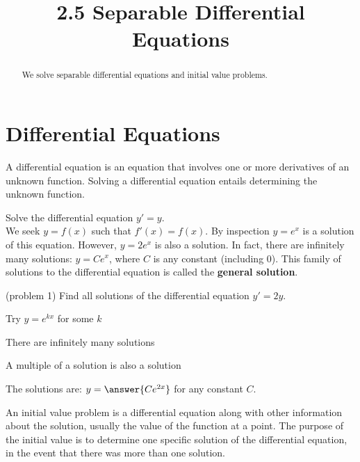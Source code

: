 \documentclass[handout]{ximera}
\title{2.5 Separable Differential Equations}
\begin{document}
\begin{abstract}
We solve separable differential equations and initial value problems.
\end{abstract}

\maketitle

\section{Differential Equations}

A differential equation is an equation that involves one or more derivatives of an unknown function. 
Solving a differential equation entails determining the unknown function.

\begin{example}[example 1]
Solve the differential equation $y' = y$.\\
We seek $y = f(x)$ such that $f'(x) = f(x)$. By inspection $y = e^x$ is a solution of this equation.
However, $y = 2e^x$ is also a solution. In fact, there are infinitely many solutions: $y = Ce^x$,
where $C$ is any constant (including 0). This family of solutions to the differential equation is called the 
\textbf{general solution}.
\end{example}



\begin{problem}(problem 1)
Find all solutions of the differential equation $y' = 2y$.\\
\begin{hint}
Try $y = e^{kx}$ for some $k$
\end{hint}
\begin{hint}
There are infinitely many solutions
\end{hint}
\begin{hint}
A multiple of a solution is also a solution
\end{hint}
The solutions are: \; $y = \answer{Ce^{2x}}$ \; for any constant $C$.
\end{problem}



An initial value problem is a differential equation along with other information about the solution, usually the value of the function at a point.
The purpose of the initial value is to determine one specific solution of the differential equation, in the event that there was more than one solution.
\end{document}
